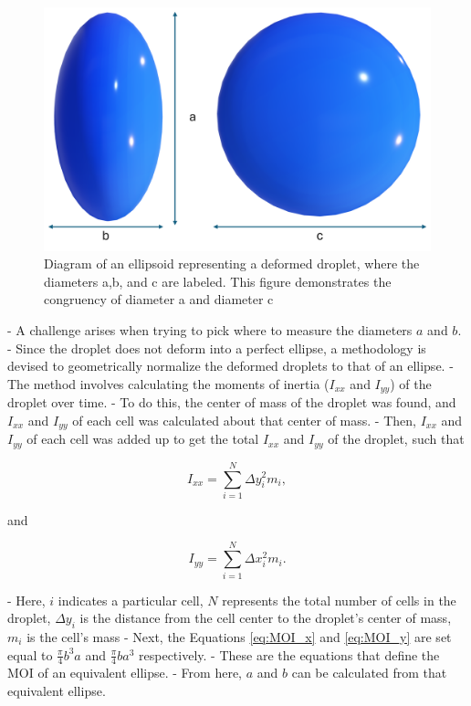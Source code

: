 \documentclass{UCF_ETD}
\begin{document}
\begin{figure}
    \centering
    \includegraphics[width=0.8\linewidth]{Figures/ellipsoid.png}
    \caption{Diagram of an ellipsoid representing a deformed droplet, where the diameters a,b, and c are labeled. This figure demonstrates the congruency of diameter a and diameter c}
    \label{fig:ellipsoid}
\end{figure}

- A challenge arises when trying to pick where to measure the diameters $a$ and $b$. 
- Since the droplet does not deform into a perfect ellipse, a methodology is devised to geometrically normalize the deformed droplets to that of an ellipse.
- The method involves calculating the moments of inertia ($I_{xx}$ and $I_{yy}$)  of the droplet over time. 
- To do this, the center of mass of the droplet was found, and $I_{xx}$ and $I_{yy}$ of each cell was calculated about that center of mass.
- Then, $I_{xx}$ and $I_{yy}$ of each cell was added up to get the total $I_{xx}$ and $I_{yy}$ of the droplet, such that

\begin{equation}
    I_{xx} = \sum_{i=1}^{N} \Delta y_{i}^{2} m_{i},
    \label{eq:MOI_x}
\end{equation}

\noindent and 

\begin{equation}
    I_{yy} = \sum_{i=1}^{N} \Delta x_{i}^{2} m_{i}.
    \label{eq:MOI_y}
\end{equation}

- Here, $i$ indicates a particular cell, $N$ represents the total number of cells in the droplet, $\Delta y_{i}$ is the distance from the cell center to the droplet's center of mass, $m_{i}$ is the cell's mass
- Next, the Equations \ref{eq:MOI_x} and \ref{eq:MOI_y} are set equal to $\frac{\pi}{4} b^{3} a$ and $\frac{\pi}{4} b a^{3}$ respectively.
- These are the equations that define the MOI of an equivalent ellipse. 
- From here, $a$ and $b$ can be calculated from that equivalent ellipse.
\end{document}
